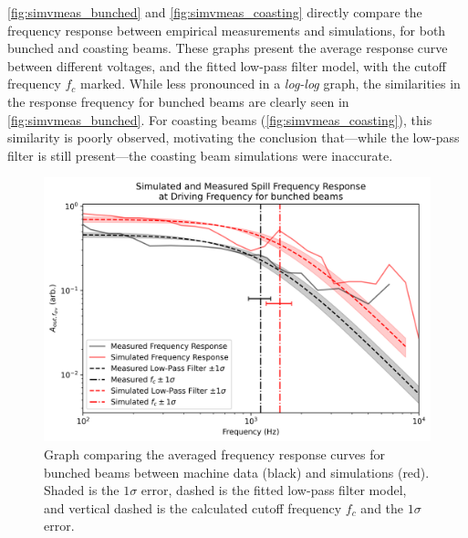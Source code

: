 \documentclass[a4paper,twoside,11pt]{report}
\begin{document}
\autoref{fig:simvmeas_bunched} and \autoref{fig:simvmeas_coasting} directly compare the frequency response between empirical measurements and simulations, 
for both bunched and coasting beams. These graphs present the average response curve between different voltages, and the fitted low-pass filter model, with the cutoff frequency $f_c$ marked. While less pronounced in a \textit{log-log} graph, the similarities in the response frequency for bunched beams are clearly seen in \autoref{fig:simvmeas_bunched}. For coasting beams (\autoref{fig:simvmeas_coasting}), this similarity is poorly observed, motivating the conclusion that---while the low-pass filter is still present---the coasting beam simulations were inaccurate.   

\begin{figure}[!h]
  \centering
  \includegraphics*[width=0.8\linewidth]{simvmeas_bunched.png}
  \caption[Comparisons of machine and simulation data of RFKO with \textbf{bunched} beams]{Graph comparing the averaged frequency response curves for bunched beams between machine data (black) and simulations (red). Shaded is the $1\sigma$ error, dashed is the fitted low-pass filter model, and vertical dashed is the calculated cutoff frequency $f_c$ and the $1\sigma$ error.}\label{fig:simvmeas_bunched}
\end{figure}
\end{document}
